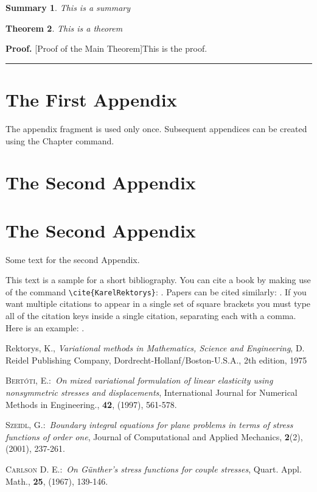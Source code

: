 \documentclass{report}%
\newtheorem{theorem}{Theorem}
\newtheorem{summary}[theorem]{Summary}
\newenvironment{proof}[1][Proof]{\textbf{#1.} }{\ \rule{0.5em}{0.5em}}
\begin{document}
\begin{summary}
This is a summary
\end{summary}

\begin{theorem}
This is a theorem
\end{theorem}

\begin{proof}
[Proof of the Main Theorem]This is the proof.
\end{proof}

\appendix

\chapter{The First Appendix}

The appendix fragment is used only once. Subsequent appendices can be created using the
Chapter command.

\chapter{The Second Appendix}

\chapter{The Second Appendix}

Some text for the second Appendix.

This text is a sample for a short bibliography. You can cite a
book by making use of the command \verb"\cite{KarelRektorys}":
\cite{KarelRektorys}. Papers can be cited similarly:
\cite{Bertoti97}. If you want multiple citations to appear in a
single set of square brackets you must type all of the citation
keys inside a single citation, separating each with a comma. Here
is an example: \cite{Bertoti97, Szeidl2001, Carlson67}.

\begin{thebibliography}{9}
Rektorys, K., \textit{Variational methods in Mathematics,
Science and Engineering}, D. Reidel Publishing Company,
Dordrecht-Hollanf/Boston-U.S.A., 2th edition, 1975

 \textsc{Bert\'{o}ti, E.}:\ \textit{On mixed variational formulation
of linear elasticity using nonsymmetric stresses and
displacements}, International Journal for Numerical Methods in
Engineering., \textbf{42}, (1997), 561-578.

 \textsc{Szeidl, G.}:\ \textit{Boundary integral equations for
plane problems in terms of stress functions of order one}, Journal
of Computational and Applied Mechanics, \textbf{2}(2), (2001),
237-261.

  \textsc{Carlson D. E.}:\ \textit{On G\"{u}nther's stress functions
for couple stresses}, Quart. Appl. Math., \textbf{25}, (1967),
139-146.
\end{thebibliography}
\end{document}
